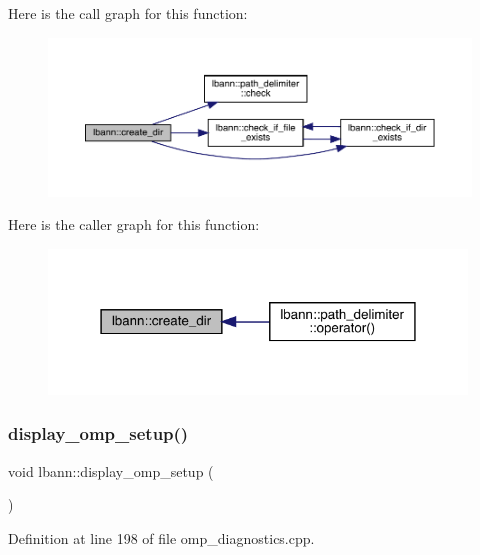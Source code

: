 Here is the call graph for this function\+:\nopagebreak
\begin{figure}[H]
\begin{center}
\leavevmode
\includegraphics[width=350pt]{namespacelbann_a1208673c880ccf0e1a9c5db6a8ed81f8_cgraph}
\end{center}
\end{figure}
Here is the caller graph for this function\+:\nopagebreak
\begin{figure}[H]
\begin{center}
\leavevmode
\includegraphics[width=315pt]{namespacelbann_a1208673c880ccf0e1a9c5db6a8ed81f8_icgraph}
\end{center}
\end{figure}
\mbox{\label{namespacelbann_a26debfaa06e8490c7f258ed7923870c7}} 
\subsubsection{\texorpdfstring{display\+\_\+omp\+\_\+setup()}{display\_omp\_setup()}}
{\footnotesize\ttfamily void lbann\+::display\+\_\+omp\+\_\+setup (\begin{DoxyParamCaption}{ }\end{DoxyParamCaption})}



Definition at line 198 of file omp\+\_\+diagnostics.\+cpp.


